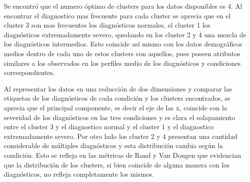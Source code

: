 \medbreak

Se encontró que el numero óptimo de clusters para los datos disponibles es 4. Al encontrar el diagnostico mas frecuente para cada cluster se aprecia que en el cluster 3 son mas frecuentes los diagnósticos normales, el cluster 1 los diagnósticos extremadamente severo, quedando en los cluster 2 y 4 una mezcla de los diagnósticos intermedios. Esto coincide así mismo con los datos demográficos medios dentro de cada uno de estos clusters con aquellos, pues poseen atributos similares a los observados en los perfiles medio de los diagnósticos y condiciones correspondientes.

\medbreak

Al representar los datos en una reducción de dos dimensiones y comparar las etiquetas de los diagnósticos de cada condición y los clusters encontrados, se aprecia que el principal componente, es decir el eje de las x, coincide con la severidad de los diagnósticos en las tres condiciones y es clara el solapamiento entre el cluster 3 y el diagnostico normal y el cluster 1 y el diagnostico extremadamente severo. Por otro lado los cluster 2 y 4 presentan una cantidad considerable de múltiples diagnósticos y esta distribución cambia según la condición. Esto se refleja en las métricas de Rand y Van Dongen que evidencian que la distribución de los clusters, si bien coincide de alguna manera con los diagnósticos, no refleja completamente los mismos.


